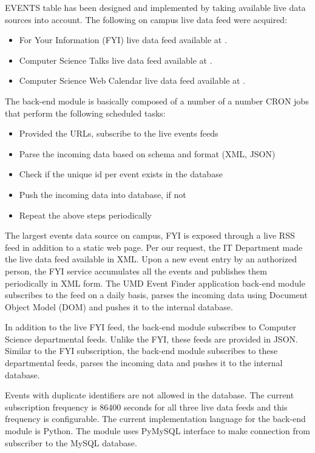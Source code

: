 \documentclass{acm_proc_article-sp}
\begin{document}
EVENTS table has been designed and implemented by taking available live data sources into account. The following on campus live data feed were acquired:
\begin{itemize}
\item For Your Information (FYI) live data feed available at \cite{fyi:xmlfeed}.
\item Computer Science Talks live data feed available at \cite{cs:talks}.
\item Computer Science Web Calendar live data feed available at \cite{cs:webcal}.
\end{itemize}

The back-end module is basically composed of a number of a number CRON jobs that perform the following scheduled tasks:

\begin{itemize}
\item Provided the URLs, subscribe to the live events feeds 
\item Parse the incoming data based on schema and format (XML, JSON)
\item Check if the unique id per event exists in the database
\item Push the incoming data into database, if not
\item Repeat the above steps periodically
\end{itemize}

The largest events data source on campus, FYI is exposed through a live RSS feed in addition to a static web page. Per our request, the IT Department made the live data feed available in XML. Upon a new event entry by an authorized person, the FYI service accumulates all the events and publishes them periodically in XML form. The UMD Event Finder application back-end module subscribes to the feed on a daily basis, parses the incoming data using Document Object Model (DOM) and pushes it to the internal database. 

In addition to the live FYI feed, the back-end module subscribes to Computer Science departmental feeds. Unlike the FYI, these feeds are provided in JSON. Similar to the FYI subscription, the back-end module subscribes to these departmental feeds, parses the incoming data and pushes it to the internal database.

Events with duplicate identifiers are not allowed in the database. The current subscription frequency is 86400 seconds for all three live data feeds and this frequency is configurable. The current implementation language for the back-end module is Python. The module uses PyMySQL interface to make connection from subscriber to the MySQL database.
\end{document}
